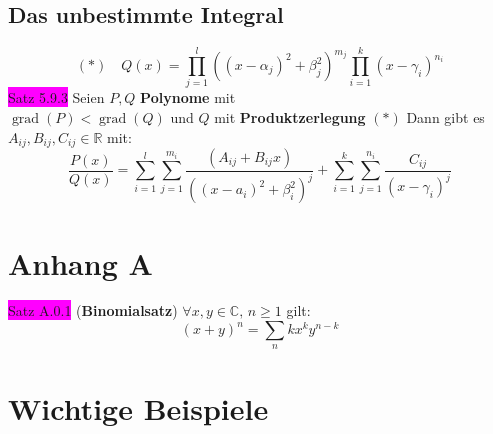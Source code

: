 \documentclass[landscape, 10pt]{article}
\newcommand{\R}{\mathbb{R}}
\newcommand{\C}{\mathbb{C}}
\begin{document}
\begin{multicols}{3}
       \subsection{Das unbestimmte Integral}
                     \begin{equation*}
                            (*) \quad
                            Q(x)=\prod_{j=1}^l
                            ((x-\alpha_j)^2+\beta_j^2)^{m_j}
                            \prod_{i=1}^k
                            (x-\gamma_i)^{n_i}
                     \end{equation*}
              \colorbox{magenta}{Satz 5.9.3} 
                     Seien \textcolor{NavyBlue}{$P,Q$} 
                     \textbf{Polynome} mit \\
                     \textcolor{NavyBlue}{
                     $\operatorname{grad}(P)
                     <\operatorname{grad}(Q)$} und 
                     \textcolor{NavyBlue}{$Q$}
                     mit \textbf{Produktzerlegung} $(*)$ 
                     Dann gibt es 
                     \textcolor{NavyBlue}{
                     $A_{ij},B_{ij},C_{ij}\in\R$} mit:
                     \begin{equation*}
                            \frac{P(x)}{Q(x)}
                            =\sum_{i=1}^l\sum_{j=1}^{m_i}
                            \frac{(A_{ij}+B_{ij}x)}{((x-a_i)^2
                            +\beta_i^2)^j}
                            +\sum_{i=1}^k\sum_{j=1}^{n_i}
                            \frac{C_{ij}}{(x-\gamma_i)^j}
                     \end{equation*}


\section{Anhang A}
              \colorbox{magenta}{Satz A.0.1} 
              (\textbf{Binomialsatz}) 
                     \textcolor{NavyBlue}{
                     $\forall x,y\in\C,\,n\geqslant1$} gilt:
                     \begin{equation*}
                            (x+y)^n=\sum_{n}{k}x^ky^{n-k}
                     \end{equation*}


\section{Wichtige Beispiele}

\end{multicols}
\end{document}
